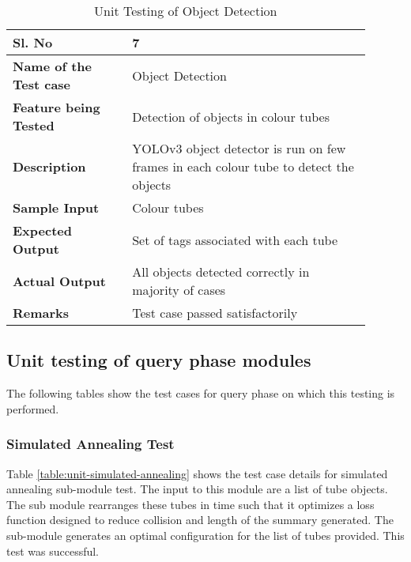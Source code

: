         \FloatBarrier
        \begin{table}[H]
            \caption{Unit Testing of Object Detection}
            \begin{tabular}{|p{0.3\linewidth}|p{0.6\linewidth}|}
                \hline
                \textbf{Sl. No }              &\textbf{ 7}\\
                \hline
                \textbf{Name of the Test case}& Object Detection \\
                \hline
                \textbf{Feature being Tested}  & Detection of objects in colour tubes \\
                \hline
                \textbf{Description}           & YOLOv3 object detector is run
                on few frames in each colour tube to detect the objects \\
                \hline
                \textbf{Sample Input}          & Colour tubes \\
                \hline
                \textbf{Expected Output}       & Set of tags associated with
                each tube \\
                \hline
                \textbf{Actual Output}         & All objects detected correctly
                in majority of cases \\
                \hline
                \textbf{Remarks }              & Test case passed satisfactorily \\
                \hline
            \end{tabular}
            \label{table:unit-object-detection}
        \end{table}


    \subsection{Unit testing of query phase modules}
    The following tables show the test cases for query phase on which this
    testing is performed.

        \subsubsection{Simulated Annealing Test}

        Table \ref{table:unit-simulated-annealing} shows the test case details
        for simulated annealing sub-module test. The input to this module are a
        list of tube objects. The sub module rearranges these tubes in time
        such that it optimizes a loss function designed to reduce collision and
        length of the summary generated. The sub-module generates an optimal
        configuration for the list of tubes provided. This test was successful.

